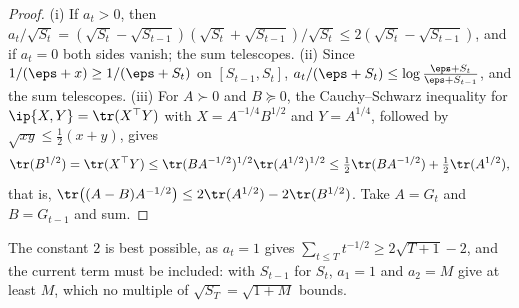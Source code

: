 \begin{refsection}
\begin{proof}
(i) If $a_t>0$, then $a_t/\sqrt{S_t}=(\sqrt{S_t}-\sqrt{S_{t-1}})(\sqrt{S_t}+\sqrt{S_{t-1}})/\sqrt{S_t}\le2(\sqrt{S_t}-\sqrt{S_{t-1}})$, and if $a_t=0$ both sides vanish; the sum telescopes. (ii) Since $1/(\eps+x)\ge1/(\eps+S_t)$ on $[S_{t-1},S_t]$, $a_t/(\eps+S_t)\le\log\frac{\eps+S_t}{\eps+S_{t-1}}$, and the sum telescopes. (iii) For $A\succ0$ and $B\succeq0$, the Cauchy--Schwarz inequality for $\ip{X,Y}=\tr(X^\top Y)$ with $X=A^{-1/4}B^{1/2}$ and $Y=A^{1/4}$, followed by $\sqrt{xy}\le\frac12(x+y)$, gives
\[
  \tr(B^{1/2})=\tr(X^\top Y)\le\tr(BA^{-1/2})^{1/2}\tr(A^{1/2})^{1/2}\le\tfrac12\tr(BA^{-1/2})+\tfrac12\tr(A^{1/2}),
\]
that is, $\tr\bigl((A-B)A^{-1/2}\bigr)\le2\tr(A^{1/2})-2\tr(B^{1/2})$. Take $A=G_t$ and $B=G_{t-1}$ and sum.
\end{proof}

The constant $2$ is best possible, as $a_t=1$ gives $\sum_{t\le T}t^{-1/2}\ge2\sqrt{T+1}-2$, and the current term must be included: with $S_{t-1}$ for $S_t$, $a_1=1$ and $a_2=M$ give at least $M$, which no multiple of $\sqrt{S_T}=\sqrt{1+M}$ bounds.


\end{refsection}
